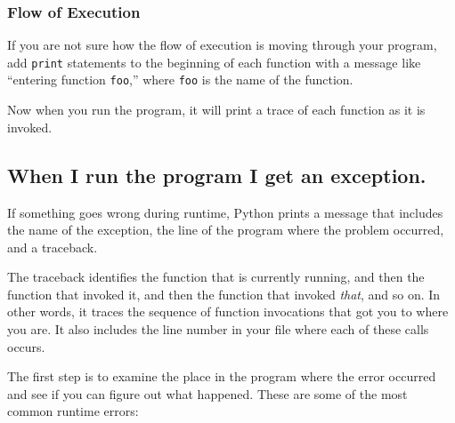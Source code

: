 \documentclass[10pt]{book}
\begin{document}
\subsubsection{Flow of Execution}

If you are not sure how the flow of execution is moving through
your program, add {\tt print} statements to the beginning of each
function with a message like ``entering function {\tt foo},'' where
{\tt foo} is the name of the function.

Now when you run the program, it will print a trace of each
function as it is invoked.


\subsection{When I run the program I get an exception.}

If something goes wrong during runtime, Python
prints a message that includes the name of the
exception, the line of the program where the problem occurred,
and a traceback.


The traceback identifies the function that is currently running,
and then the function that invoked it, and then the function that
invoked \emph{that}, and so on.  In other words, it traces the
sequence of function invocations that got you to where you are.  It
also includes the line number in your file where each of these
calls occurs.

The first step is to examine the place in the program where
the error occurred and see if you can figure out what happened.
These are some of the most common runtime errors:
\end{document}
